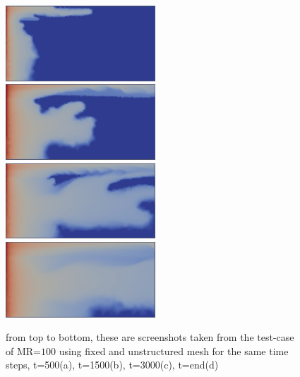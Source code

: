 \documentclass[preprint,authoryear,12pt]{elsarticle}
\begin{document}
{\begin{figure}
\centering
\includegraphics[width=0.5\textwidth]{./Pics1/mr100_fixed/mr100_fixed_500.pdf}\\[2mm]%
\includegraphics[width=0.5\textwidth]{./Pics1/mr100_fixed/mr100_fixed_1500.pdf}\\[2mm]%
\includegraphics[width=0.5\textwidth]{./Pics1/mr100_fixed/mr100_fixed_3000.pdf}\\[2mm]%
\includegraphics[width=0.5\textwidth]{./Pics1/mr100_fixed/mr100_fixed_end.pdf}%
\caption{from top to bottom, these are screenshots taken from the test-case of MR=$100$ using fixed and unstructured mesh for the same time steps, t=500(a), t=1500(b), t=3000(c), t=end(d) }
\label{fig:4testcase}
\end{figure}




}
\end{document}
